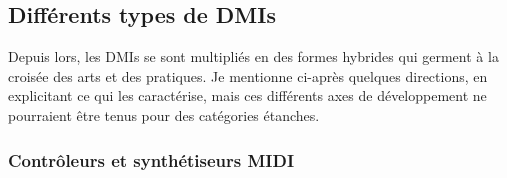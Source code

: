 \subsection{Différents types de DMIs}

\noindent Depuis lors, les \glspl{DMI} se sont multipliés en des formes hybrides qui germent à la croisée des arts et des pratiques. Je mentionne ci-après quelques directions, en explicitant ce qui les caractérise, mais ces différents axes de développement ne pourraient être tenus pour des catégories étanches.

\subsubsection{Contrôleurs et synthétiseurs MIDI}


